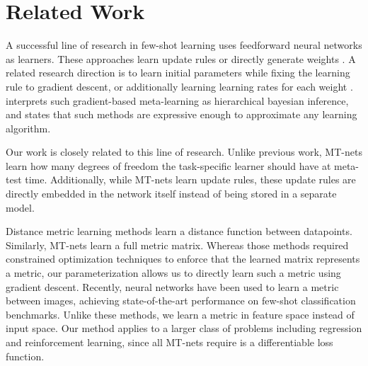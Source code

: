 \documentclass{article}
\newcommand{\0}{{\bf 0}}
\begin{document}
\section{Related Work}

\iffalse
A straightforward approach for applying meta-learning to deep networks is to meta-learn some pattern of the weights of a neural network or its updates; previous work has learned an update rule \cite{RaviS2017iclr, Li2016nips, Andrychowicz2016nips}, directly generated weights \cite{Ha2017iclr}, or learned good initial weights to fine-tune \cite{FinnC2017arxiv}.
Another line of research uses recurrent neural networks to encode a learning rule and sequentially inputs training data to this neural network \cite{SantoroA2016icml,Mishra2018iclr,MunkhdalaiT2017icml,Duan2016arxiv, Wang2016arxiv}.
An approach that has been successful in the domain of few-shot classification is to learn a distance metric between images and use this metric to find the most similar previously seen image to a new image \cite{KochG2015icml, VinyalsO2016nips, SnellJ2017nips}.
\fi

A successful line of research in few-shot learning uses feedforward neural networks as learners.
These approaches learn update rules \cite{RaviS2017iclr, Li2016nips, Andrychowicz2016nips} or directly generate weights \cite{Ha2017iclr}.
A related research direction is to learn initial parameters \cite{FinnC2017icml} while fixing the learning rule to gradient descent,
 or additionally learning learning rates for each weight \cite{Li2017arxiv}.
\cite{Grant2018iclr} interprets such gradient-based meta-learning as hierarchical bayesian inference, and
\cite{FinnC2017arxiv} states that such methods are expressive enough to approximate any learning algorithm.

Our work is closely related to this line of research.
Unlike previous work, MT-nets learn how many degrees of freedom the task-specific learner should have at meta-test time.
Additionally, while MT-nets learn update rules, these update rules are directly embedded in the network itself instead of being stored in a separate model.

Distance metric learning \cite{XingEP2002nips, WeinbergerKQ2005nips} methods learn a distance function between datapoints.
Similarly, MT-nets learn a full metric matrix.
Whereas those methods required constrained optimization techniques to enforce that the learned matrix represents a metric,
our parameterization allows us to directly learn such a metric using gradient descent.
Recently, neural networks have been used to learn a metric between images\cite{KochG2015icml, VinyalsO2016nips, SnellJ2017nips},
achieving state-of-the-art performance on few-shot classification benchmarks.
Unlike these methods, we learn a metric in feature space instead of input space.
Our method applies to a larger class of problems including regression and reinforcement learning, since all MT-nets require is a differentiable loss function.
\end{document}
